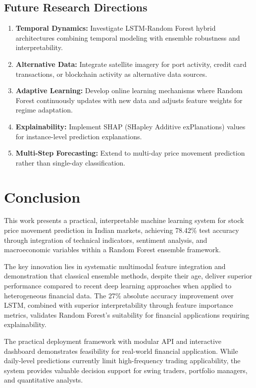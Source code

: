 \documentclass[conference]{IEEEtran}
\begin{document}
\subsection{Future Research Directions}

\begin{enumerate}
\item \textbf{Temporal Dynamics:} Investigate LSTM-Random Forest hybrid architectures combining temporal modeling with ensemble robustness and interpretability.

\item \textbf{Alternative Data:} Integrate satellite imagery for port activity, credit card transactions, or blockchain activity as alternative data sources.

\item \textbf{Adaptive Learning:} Develop online learning mechanisms where Random Forest continuously updates with new data and adjusts feature weights for regime adaptation.

\item \textbf{Explainability:} Implement SHAP (SHapley Additive exPlanations) values for instance-level prediction explanations.

\item \textbf{Multi-Step Forecasting:} Extend to multi-day price movement prediction rather than single-day classification.
\end{enumerate}

\section{Conclusion}

This work presents a practical, interpretable machine learning system for stock price movement prediction in Indian markets, achieving 78.42\% test accuracy through integration of technical indicators, sentiment analysis, and macroeconomic variables within a Random Forest ensemble framework. 

The key innovation lies in systematic multimodal feature integration and demonstration that classical ensemble methods, despite their age, deliver superior performance compared to recent deep learning approaches when applied to heterogeneous financial data. The 27\% absolute accuracy improvement over LSTM, combined with superior interpretability through feature importance metrics, validates Random Forest's suitability for financial applications requiring explainability.

The practical deployment framework with modular API and interactive dashboard demonstrates feasibility for real-world financial application. While daily-level predictions currently limit high-frequency trading applicability, the system provides valuable decision support for swing traders, portfolio managers, and quantitative analysts.
\end{document}
